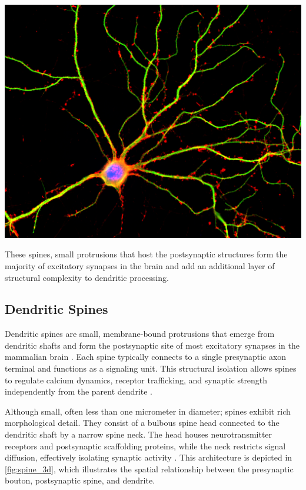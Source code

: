 \begin{center}
    \includegraphics[width=.6\textwidth]{figures/03_flourocence_image_dendrite.png} 
    \label{fig:flourocence_image_dendrite}
\end{center}


These spines, small protrusions that host the postsynaptic structures form the majority of excitatory synapses in the brain and add an additional layer of structural complexity to dendritic processing. 

\subsection{Dendritic Spines}
Dendritic spines are small, membrane-bound protrusions that emerge from dendritic shafts and form the postsynaptic site of most excitatory synapses in the mammalian brain \cite{Yuste_1995}. Each spine typically connects to a single presynaptic axon terminal and functions as a signaling unit. This structural isolation allows spines to regulate calcium dynamics, receptor trafficking, and synaptic strength independently from the parent dendrite \cite{Yuste_2001}.

Although small, often less than one micrometer in diameter; spines exhibit rich morphological detail. They consist of a bulbous spine head connected to the dendritic shaft by a narrow spine neck. The head houses neurotransmitter receptors and postsynaptic scaffolding proteins, while the neck restricts signal diffusion, effectively isolating synaptic activity \cite{Pfeiffer_2018}. This architecture is depicted in \autoref{fig:spine_3d}, which illustrates the spatial relationship between the presynaptic bouton, postsynaptic spine, and dendrite.

